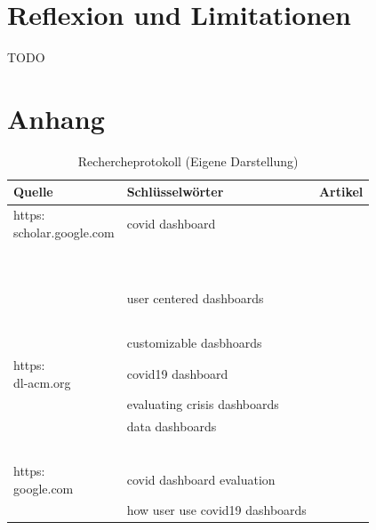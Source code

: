 \documentclass[12pt, oneside]{article}
\begin{document}
\clearpage
\section{Reflexion und Limitationen}
TODO


\clearpage



\clearpage
\section*{Anhang}
\begin{table}[ht]
	\begin{tabular}{@{}p{4cm}p{4cm}p{6.5cm}@{}}
		\toprule
		\textbf{Quelle} & \textbf{Schlüsselwörter}        & \textbf{Artikel}        \\ \midrule
		\url{https:                                                                 \\scholar.google.com}                         & covid dashboard                 & ~\citep{Dong.2020}         \\ \midrule
		                &                                 & ~\citep{Florez.2020}    \\ \midrule
		                &                                 & ~\citep{Berry.2020}     \\ \midrule
		                & user centered dashboards        & ~\citep{Francois.2021}  \\ \midrule
		                &                                 & ~\citep{Young.2020}     \\ \midrule
		                & customizable dasbhoards         & ~\citep{Roberts.2017}   \\ \midrule
		\url{https:                                                                 \\dl-acm.org}                                 & covid19 dashboard               & ~\citep{Vitale.}           \\ \midrule
		                & evaluating crisis dashboards    & ~\citep{Ivanov.2018}    \\ \midrule
		                & data dashboards                 & ~\citep{Maheshwari.}    \\ \midrule
		                &                                 & ~\citep{Beheshti.}      \\ \midrule
		\url{https:                                                                 \\google.com}                                 & covid dashboard evaluation      & ~\citep{Barbazza.}         \\ \midrule
		                & how user use covid19 dashboards & ~\citep{Ivankovic.2021} \\ \bottomrule
	\end{tabular}
	\caption{\label{tab:research-protocol}Rechercheprotokoll (Eigene Darstellung)}
\end{table}
\clearpage
\end{document}
